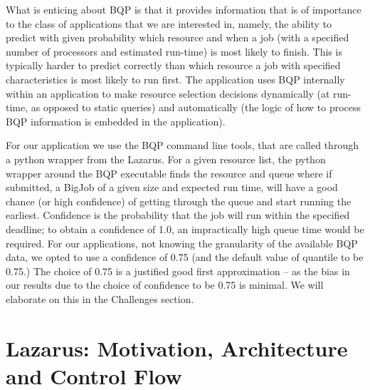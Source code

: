 \documentclass{sig-alternate}
\newcommand{\up}{\vspace*{-0.3em}}
\newcommand{\jhanote}[1]{ {\textcolor{red} { ***Jha: #1 }}}
\newcommand{\yyenote}[1]{ {\textcolor{blue} { ***yye00: #1 }}}
\newcommand{\jhanote}[1]{}
\newcommand{\yyenote}[1]{}
\begin{document}
What is enticing about BQP is that it provides information that is of
importance to the class of applications that we are interested in,
namely, the ability to predict with given probability which resource
and when a job (with a specified number of processors and estimated
run-time) is most likely to finish.  This is typically harder to
predict correctly than which resource a job with specified
characteristics is most likely to run first.  The application uses BQP
internally within an application to make resource selection decisions
dynamically (at run-time, as opposed to static queries) and
automatically (the logic of how to process BQP information is embedded
in the application).

For our application we use the BQP command line tools, that are called
through a python wrapper from the Lazarus.  For a given resource list,
the python wrapper around the BQP executable finds the resource and
queue where if submitted, a BigJob of a given size and expected run
time, will have a good chance (or high confidence) of getting through
the queue and start running the earliest. Confidence is the
probability that the job will run within the specified deadline; to
obtain a confidence of 1.0, an impractically high queue time would be
required. For our applications, not knowing the granularity of the
available BQP data, we opted to use a confidence of 0.75 (and the
default value of quantile to be 0.75.)  The choice of 0.75 is a
justified good first approximation -- as the bias in our results due
to the choice of confidence to be 0.75 is minimal. We will elaborate
on this in the Challenges section.



\up\up\up\up

\section{Lazarus: Motivation, Architecture and Control Flow}
\end{document}
